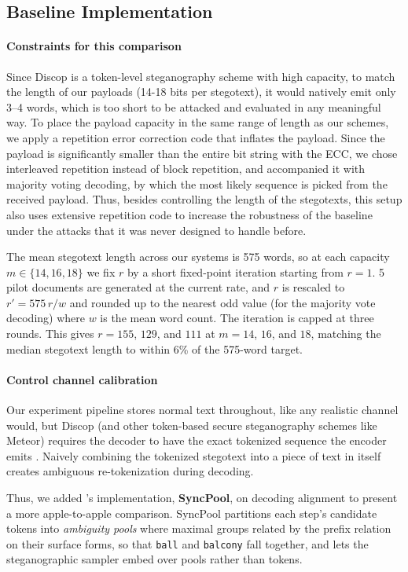 \subsection{Baseline Implementation}
\paragraph{Constraints for this comparison}
Since Discop is a token-level steganography scheme with high capacity, to match the length of our payloads (14-18 bits per stegotext), it would natively emit only 3--4 words, which is too short to be attacked and evaluated in any meaningful way.
To place the payload capacity in the same range of length as our schemes, we apply a repetition error correction code that inflates the payload.
Since the payload is significantly smaller than the entire bit string with the ECC, we chose interleaved repetition instead of block repetition, and accompanied it with majority voting decoding, by which the most likely sequence is picked from the received payload. 
Thus, besides controlling the length of the stegotexts, this setup also uses extensive repetition code to increase the robustness of the baseline under the attacks that it was never designed to handle before.

The mean stegotext length across our systems is 575 words, so at each capacity $m \in \{14, 16, 18\}$ we fix $r$ by a short fixed-point iteration starting from $r = 1$.
5 pilot documents are generated at the current rate, and $r$ is rescaled to $r' = 575\,r / w$ and rounded up to the nearest odd value (for the majority vote decoding) where $w$ is the mean word count.
The iteration is capped at three rounds.
This gives $r = 155$, $129$, and $111$ at $m = 14$, $16$, and $18$, matching the median stegotext length to within 6\% of the 575-word target.

\paragraph{Control channel calibration}
Our experiment pipeline stores normal text throughout, like any realistic channel would, but Discop (and other token-based secure steganography schemes like Meteor) requires the decoder to have the exact tokenized sequence the encoder emits \citep{qi2024provably, wang2026retoksync}.
Naively combining the tokenized stegotext into a piece of text in itself creates ambiguous re-tokenization during decoding.

Thus, we added \citet{qi2024provably}'s implementation, \textbf{SyncPool}, on decoding alignment to present a more apple-to-apple comparison.
SyncPool partitions each step's candidate tokens into \emph{ambiguity pools} where maximal groups related by the prefix relation on their surface forms, so that \texttt{ball} and \texttt{balcony} fall together, and lets the steganographic sampler embed over pools rather than tokens.

